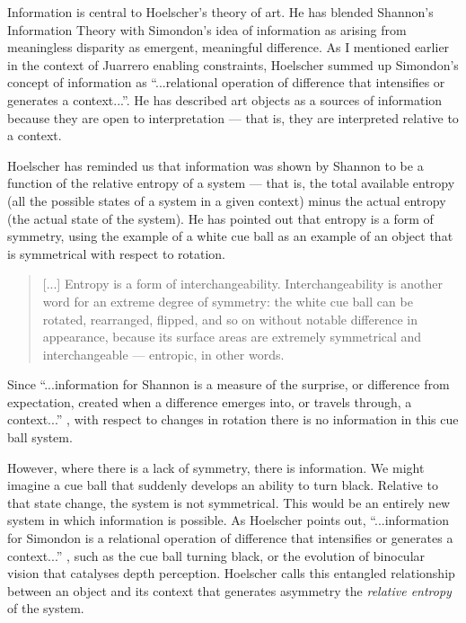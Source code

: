                 Information is central to Hoelscher's theory of art. He has blended Shannon's Information Theory with Simondon's idea of information as arising from meaningless disparity as emergent, meaningful difference. As I mentioned earlier in the context of Juarrero enabling constraints, Hoelscher summed up Simondon's concept of information as “...relational operation of difference that intensifies or generates a context...”. He has described art objects as a sources of information because they are open to interpretation — that is, they are interpreted relative to a context. 
                
                Hoelscher has reminded us that information was shown by Shannon to be a function of the relative entropy of a system — that is, the total available entropy (all the possible states of a system in a given context) minus the actual entropy (the actual state of the system). He has pointed out that entropy is a form of symmetry, using the example of a white cue ball as an example of an object that is symmetrical with respect to rotation.
                
                \begin{quote}
                    [...] Entropy is a form of interchangeability. Interchangeability is another word for an extreme degree of symmetry: the white cue ball can be rotated, rearranged, flipped, and so on without notable difference in appearance, because its surface areas are extremely symmetrical and interchangeable — entropic, in other words.
                \end{quote}

                Since “...information for Shannon is a measure of the surprise, or difference from expectation, created when a difference emerges into, or travels through, a context...” \citep[p.6]{HoelscherArtAsInfrmtn2021}, with respect to changes in rotation there is no information in this cue ball system. 
                
                However, where there is a lack of symmetry, there is information. We might imagine a cue ball that suddenly develops an ability to turn black. Relative to that state change, the system is not symmetrical. This would be an entirely new system in which information is possible. As Hoelscher points out, “...information for Simondon is a relational operation of difference that intensifies or generates a context...” \citep[p.6]{HoelscherArtAsInfrmtn2021}, such as the cue ball turning black, or the evolution of binocular vision that catalyses depth perception. Hoelscher calls this entangled relationship between an object and its context that generates asymmetry the \emph{relative entropy} of the system.
                
